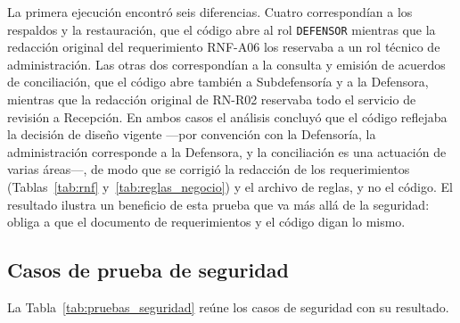 	La primera ejecución encontró seis diferencias. Cuatro correspondían a los respaldos y la
	restauración, que el código abre al rol \texttt{DEFENSOR} mientras que la redacción original del
	requerimiento RNF-A06 los reservaba a un rol técnico de administración. Las otras dos
	correspondían a la consulta y emisión de acuerdos de conciliación, que el código abre también a
	Subdefensoría y a la Defensora, mientras que la redacción original de RN-R02 reservaba todo el
	servicio de revisión a Recepción. En ambos casos el análisis concluyó que el código reflejaba la
	decisión de diseño vigente ---por convención con la Defensoría, la administración corresponde a la
	Defensora, y la conciliación es una actuación de varias áreas---, de modo que se corrigió la redacción de los requerimientos
	(Tablas~\ref{tab:rnf} y~\ref{tab:reglas_negocio}) y el archivo de reglas, y no el código. El
	resultado ilustra un beneficio de esta prueba que va más allá de la seguridad: obliga a que el
	documento de requerimientos y el código digan lo mismo.

	\subsection{Casos de prueba de seguridad}
	La Tabla~\ref{tab:pruebas_seguridad} reúne los casos de seguridad con su resultado.

